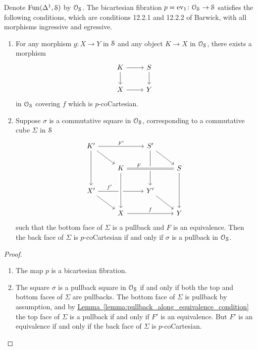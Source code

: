 \documentclass[main.tex]{subfiles}
\begin{document}
\begin{lemma}
  Denote $\Fun(\Delta^{1}, \S)$ by $\OS$. The bicartesian fibration $p = \ev_{1}\colon \OS \to \S$ satisfies the following conditions, which are conditions 12.2.1 and 12.2.2 of Barwick, with all morphisms ingressive and egressive.
  \begin{enumerate}
    \item For any morphism $g\colon X \to Y$ in $\S$ and any object $K \to X$ in $\OS$, there exists a morphism
      \begin{equation*}
        \begin{tikzcd}
          K
          \arrow[r]
          \arrow[d]
          & S
          \arrow[d]
          \\
          X
          \arrow[r]
          & Y
        \end{tikzcd}
      \end{equation*}
      in $\OS$ covering $f$ which is $p$-coCartesian.

    \item Suppose $\sigma$ is a commutative square in $\OS$, corresponding to a commutative cube $\Sigma$ in $\S$
      \begin{equation*}
        \begin{tikzcd}
          K'
          \arrow[rr, "F'"]
          \arrow[dr]
          \arrow[dd]
          && S'
          \arrow[dr]
          \arrow[dd]
          \\
          & K
          \arrow[rr, crossing over, near start, equals, "F"]
          && S
          \arrow[dd]
          \\
          X'
          \arrow[rr, near start, "f'"]
          \arrow[dr]
          && Y'
          \arrow[dr]
          \\
          & X
          \arrow[rr, "f"]
          \arrow[from=uu, crossing over]
          && Y
        \end{tikzcd}
      \end{equation*}
      such that the bottom face of $\Sigma$ is a pullback and $F$ is an equivalence. Then the back face of $\Sigma$ is $p$-coCartesian if and only if $\sigma$ is a pullback in $\OS$.
  \end{enumerate}
\end{lemma}
\begin{proof}
  \begin{enumerate}
    \item The map $p$ is a bicartesian fibration.

    \item The square $\sigma$ is a pullback square in $\OS$ if and only if both the top and bottom faces of $\Sigma$ are pullbacks. The bottom face of $\Sigma$ is pullback by assumption, and by \hyperref[lemma:pullback_along_equivalence_condition]{Lemma~\ref*{lemma:pullback_along_equivalence_condition}} the top face of $\Sigma$ is a pullback if and only if $F'$ is an equivalence. But $F'$ is an equivalence if and only if the back face of $\Sigma$ is $p$-coCartesian.
  \end{enumerate}
\end{proof}
\end{document}
